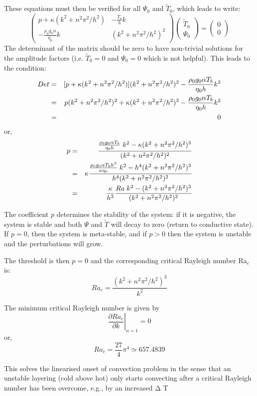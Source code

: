 These equations must then be verified for all $\Psi_0$ and $\tilde{T}_0$, 
which leads to write:
\[
\left(
\begin{array}{cc}
p + \kappa (k^2+n^2\pi^2/h^2) & -\frac{T_b}{h} k \\
-\frac{\rho_0 g_0 \alpha}{\eta_0}  k  & (k^2+n^2\pi^2/h^2)^2 
\end{array}
\right)
\left(
\begin{array}{c}
\tilde{T}_0 \\ \Psi_0
\end{array}
\right)
=
\left(
\begin{array}{c}
0 \\ 0
\end{array}
\right)
\]
The determinant of the matrix should be zero to have non-trivial solutions for
the amplitude factors (i.e. $\tilde{T}_0=0$ and $\Psi_0=0$ which is not helpful).
This leads to the condition: 
\begin{eqnarray}
Det 
&=& [p + \kappa (k^2+n^2\pi^2/h^2)](k^2+n^2\pi^2/h^2)^2 - \frac{\rho_0 g_0 \alpha T_b }{\eta_0 h}  k^2 \nonumber\\
&=& p (k^2+n^2\pi^2/h^2)^2 + \kappa (k^2+n^2\pi^2/h^2)^3 - \frac{\rho_0 g_0 \alpha T_b }{\eta_0 h}  k^2 \nonumber\\
&=& 0
\end{eqnarray}
or, 
\begin{eqnarray}
p 
&=&\frac{\frac{\rho_0 g_0 \alpha T_b }{\eta_0 h }  \; k^2 
- \kappa (k^2+n^2\pi^2/h^2)^3 }{ (k^2+n^2\pi^2/h^2)^2} \nonumber\\
&=& \kappa \frac{  \frac{\rho_0 g_0 \alpha T_b h^3}{ \kappa \eta_0}\; k^2 - h^4 (k^2+n^2\pi^2/h^2)^3 }{h^4 (k^2+n^2\pi^2/h^2)^2} \nonumber\\
&=& \frac{\kappa}{h^2}   \frac{Ra \; k^2 -(k^2+n^2\pi^2/h^2)^3 }{ (k^2+n^2\pi^2/h^2)^2}
\end{eqnarray}

The coefficient $p$ determines the stability of the system: if it is negative, 
the system is stable and both $\Psi$ and $\tilde{T}$ will decay to zero (return to conductive state). 
If $p=0$, then the system is meta-stable, and if $p>0$ then the system is unstable and 
the perturbations will grow. 

The threshold is then $p=0$ and the corresponding critical Rayleigh number $\text{Ra}_c$ is:
\[
Ra_c=\frac{(k^2+n^2\pi^2/h^2)^3}{k^2}
\]

The minimum critical Rayleigh number is given by 
\[
\left. \frac{\partial Ra_c}{\partial k}\right|_{n=1}=0
\]
or, 
\[
Ra_c = \frac{27}{4}\pi^4 \simeq 657.4839
\]


This solves the linearised onset of convection problem in the sense that an
unstable layering (cold above hot) only starts convecting after a critical
Rayleigh number has been overcome, e.g., by an increased Δ T
